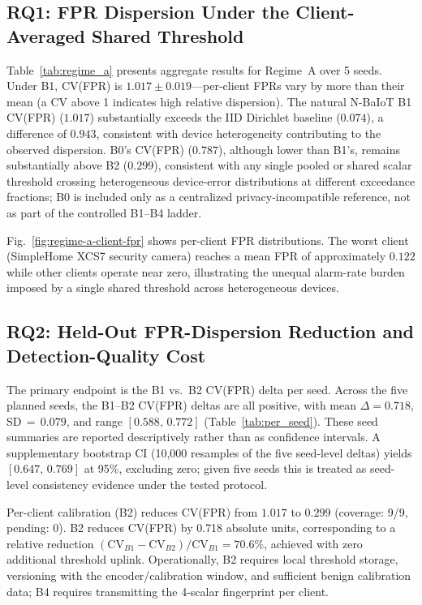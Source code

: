 \subsection{RQ1: FPR Dispersion Under the Client-Averaged Shared Threshold}

Table~\ref{tab:regime_a} presents aggregate results for Regime~A over 5 seeds.
Under B1, CV(FPR) is $1.017 \pm 0.019$---per-client FPRs vary by more than their mean
(a CV above 1 indicates high relative dispersion).
The natural N-BaIoT B1 CV(FPR) ($1.017$) substantially exceeds the IID Dirichlet
baseline ($0.074$), a difference of $0.943$, consistent with device heterogeneity
contributing to the observed dispersion.
B0's CV(FPR) ($0.787$), although lower than B1's, remains substantially above B2 ($0.299$),
consistent with any single pooled or shared scalar threshold crossing heterogeneous
device-error distributions at different exceedance fractions; B0 is included only as a
centralized privacy-incompatible reference, not as part of the controlled B1--B4 ladder.

Fig.~\ref{fig:regime-a-client-fpr} shows per-client FPR distributions.
The worst client (SimpleHome XCS7 security camera) reaches a mean FPR of approximately
$0.122$ while other clients operate near zero, illustrating the unequal alarm-rate
burden imposed by a single shared threshold across heterogeneous devices.

\subsection{RQ2: Held-Out FPR-Dispersion Reduction and Detection-Quality Cost}

The primary endpoint is the B1 vs.\ B2 CV(FPR) delta per seed.
Across the five planned seeds, the B1--B2 CV(FPR) deltas are all positive,
with mean $\Delta = 0.718$, SD$\,{=}\,0.079$, and range $[0.588,\, 0.772]$
(Table~\ref{tab:per_seed}).
These seed summaries are reported descriptively rather than as confidence intervals.
A supplementary bootstrap CI (10{,}000 resamples of the five seed-level deltas)
yields $[0.647,\, 0.769]$ at 95\%, excluding zero; given five seeds this is
treated as seed-level consistency evidence under the tested protocol.

Per-client calibration (B2) reduces CV(FPR) from $1.017$ to $0.299$ (coverage: 9/9, pending: 0).
B2 reduces CV(FPR) by 0.718 absolute units, corresponding to a relative reduction
$(\mathrm{CV}_{B1}-\mathrm{CV}_{B2})/\mathrm{CV}_{B1}=70.6\%$,
achieved with zero additional threshold uplink.
Operationally, B2 requires local threshold storage, versioning with the encoder/calibration window, and sufficient benign calibration data;
B4 requires transmitting the 4-scalar fingerprint per client.

